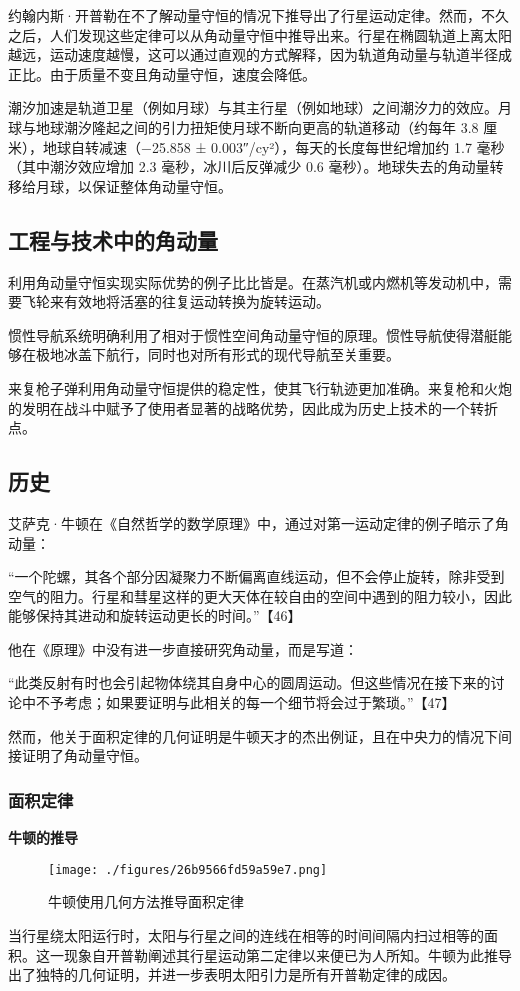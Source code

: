 约翰内斯·开普勒在不了解动量守恒的情况下推导出了行星运动定律。然而，不久之后，人们发现这些定律可以从角动量守恒中推导出来。行星在椭圆轨道上离太阳越远，运动速度越慢，这可以通过直观的方式解释，因为轨道角动量与轨道半径成正比。由于质量不变且角动量守恒，速度会降低。

潮汐加速是轨道卫星（例如月球）与其主行星（例如地球）之间潮汐力的效应。月球与地球潮汐隆起之间的引力扭矩使月球不断向更高的轨道移动（约每年 3.8 厘米），地球自转减速（−25.858 ± 0.003″/cy²），每天的长度每世纪增加约 1.7 毫秒（其中潮汐效应增加 2.3 毫秒，冰川后反弹减少 0.6 毫秒）。地球失去的角动量转移给月球，以保证整体角动量守恒。
\subsection{工程与技术中的角动量}
利用角动量守恒实现实际优势的例子比比皆是。在蒸汽机或内燃机等发动机中，需要飞轮来有效地将活塞的往复运动转换为旋转运动。

惯性导航系统明确利用了相对于惯性空间角动量守恒的原理。惯性导航使得潜艇能够在极地冰盖下航行，同时也对所有形式的现代导航至关重要。

来复枪子弹利用角动量守恒提供的稳定性，使其飞行轨迹更加准确。来复枪和火炮的发明在战斗中赋予了使用者显著的战略优势，因此成为历史上技术的一个转折点。
\subsection{历史}  
艾萨克·牛顿在《自然哲学的数学原理》中，通过对第一运动定律的例子暗示了角动量：

“一个陀螺，其各个部分因凝聚力不断偏离直线运动，但不会停止旋转，除非受到空气的阻力。行星和彗星这样的更大天体在较自由的空间中遇到的阻力较小，因此能够保持其进动和旋转运动更长的时间。”【46】

他在《原理》中没有进一步直接研究角动量，而是写道：

“此类反射有时也会引起物体绕其自身中心的圆周运动。但这些情况在接下来的讨论中不予考虑；如果要证明与此相关的每一个细节将会过于繁琐。”【47】

然而，他关于面积定律的几何证明是牛顿天才的杰出例证，且在中央力的情况下间接证明了角动量守恒。
\subsubsection{面积定律 } 
\textbf{牛顿的推导}
\begin{figure}[ht]
\centering
\texttt{[image: ./figures/26b9566fd59a59e7.png]}
\caption{牛顿使用几何方法推导面积定律} \label{fig_JDL_15}
\end{figure}
当行星绕太阳运行时，太阳与行星之间的连线在相等的时间间隔内扫过相等的面积。这一现象自开普勒阐述其行星运动第二定律以来便已为人所知。牛顿为此推导出了独特的几何证明，并进一步表明太阳引力是所有开普勒定律的成因。

